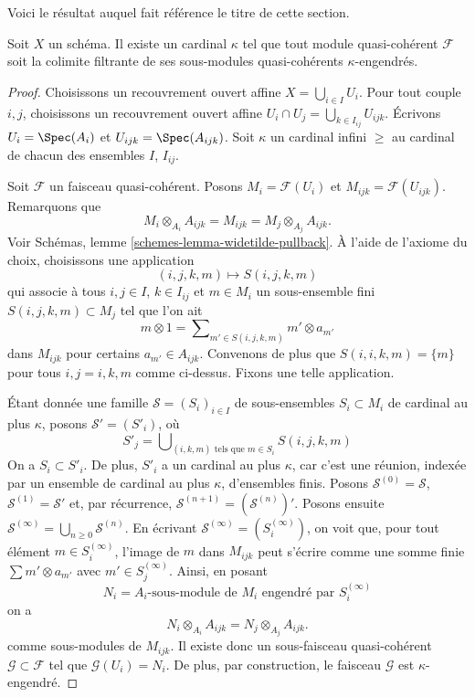 \noindent
Voici le résultat auquel fait référence le titre de cette section.

\begin{lemma}
\label{lemma-colimit-kappa}
Soit $X$ un schéma. Il existe un cardinal $\kappa$ tel que
tout module quasi-cohérent $\mathcal{F}$ soit la colimite filtrante de
ses sous-modules quasi-cohérents $\kappa$-engendrés.
\end{lemma}

\begin{proof}
Choisissons un recouvrement ouvert affine $X = \bigcup_{i \in I} U_i$. Pour tout couple
$i, j$, choisissons un recouvrement ouvert affine
$U_i \cap U_j = \bigcup_{k \in I_{ij}} U_{ijk}$.
Écrivons $U_i = \Spec(A_i)$ et $U_{ijk} = \Spec(A_{ijk})$.
Soit $\kappa$ un cardinal infini $\geq$ au cardinal de
chacun des ensembles $I$, $I_{ij}$.

\medskip\noindent
Soit $\mathcal{F}$ un faisceau quasi-cohérent. Posons $M_i = \mathcal{F}(U_i)$
et $M_{ijk} = \mathcal{F}(U_{ijk})$. Remarquons que
$$
M_i \otimes_{A_i} A_{ijk} = M_{ijk} = M_j \otimes_{A_j} A_{ijk}.
$$
Voir
Schémas, lemme \ref{schemes-lemma-widetilde-pullback}.
À l'aide de l'axiome du choix, choisissons une application
$$
(i, j, k, m) \mapsto S(i, j, k, m)
$$
qui associe à tous $i, j \in I$, $k \in I_{ij}$ et $m \in M_i$
un sous-ensemble fini $S(i, j, k, m) \subset M_j$ tel que l'on ait
$$
m \otimes 1 = \sum\nolimits_{m' \in S(i, j, k, m)} m' \otimes a_{m'}
$$
dans $M_{ijk}$ pour certains $a_{m'} \in A_{ijk}$. Convenons de plus
que $S(i, i, k, m) = \{m\}$ pour tous $i, j = i, k, m$ comme ci-dessus.
Fixons une telle application.

\medskip\noindent
Étant donnée une famille $\mathcal{S} = (S_i)_{i \in I}$ de sous-ensembles
$S_i \subset M_i$ de cardinal au plus $\kappa$, posons
$\mathcal{S}' = (S'_i)$, où
$$
S'_j = \bigcup\nolimits_{(i, k, m)\text{ tels que }m \in S_i}
S(i, j, k, m)
$$
On a $S_i \subset S'_i$. De plus, $S'_i$ a un cardinal au plus
$\kappa$, car c'est une réunion, indexée par un ensemble de cardinal au plus $\kappa$,
d'ensembles finis. Posons $\mathcal{S}^{(0)} = \mathcal{S}$,
$\mathcal{S}^{(1)} = \mathcal{S}'$ et, par récurrence,
$\mathcal{S}^{(n + 1)} = (\mathcal{S}^{(n)})'$. Posons ensuite
$\mathcal{S}^{(\infty)} = \bigcup_{n \geq 0} \mathcal{S}^{(n)}$.
En écrivant $\mathcal{S}^{(\infty)} = (S^{(\infty)}_i)$, on voit que,
pour tout élément $m \in S^{(\infty)}_i$, l'image de $m$ dans
$M_{ijk}$ peut s'écrire comme une somme finie $\sum m' \otimes a_{m'}$
avec $m' \in S_j^{(\infty)}$. Ainsi, en posant
$$
N_i = A_i\text{-sous-module de }M_i\text{ engendré par }S^{(\infty)}_i
$$
on a
$$
N_i \otimes_{A_i} A_{ijk} = N_j \otimes_{A_j} A_{ijk}.
$$
comme sous-modules de $M_{ijk}$. Il existe donc un sous-faisceau quasi-cohérent
$\mathcal{G} \subset \mathcal{F}$ tel que $\mathcal{G}(U_i) = N_i$.
De plus, par construction, le faisceau $\mathcal{G}$ est $\kappa$-engendré.


\end{proof}
